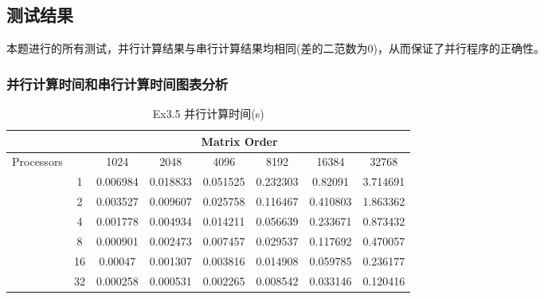 \documentclass[UTF8]{article}
\begin{document}
\subsection{测试结果}
本题进行的所有测试，并行计算结果与串行计算结果均相同(差的二范数为0)，从而保证了并行程序的正确性。
\subsubsection{并行计算时间和串行计算时间图表分析}


\begin{table}[h]
    \caption{Ex3.5 并行计算时间(s)}
    \label{tab:my-table}
    \centering
    \scalebox{0.8} {
    \begin{tabular}{|c|c|c|c|c|c|c|c|}
    \hline
                                & \multicolumn{7}{c|}{Matrix Order}                                    \\ \hline
    \multirow{7}{*}{Processors} &    & 1024     & 2048     & 4096     & 8192     & 16384    & 32768    \\ \cline{2-8} 
                                & 1  & 0.006984 & 0.018833 & 0.051525 & 0.232303 & 0.82091  & 3.714691 \\ \cline{2-8} 
                                & 2  & 0.003527 & 0.009607 & 0.025758 & 0.116467 & 0.410803 & 1.863362 \\ \cline{2-8} 
                                & 4  & 0.001778 & 0.004934 & 0.014211 & 0.056639 & 0.233671 & 0.873432 \\ \cline{2-8} 
                                & 8  & 0.000901 & 0.002473 & 0.007457 & 0.029537 & 0.117692 & 0.470057 \\ \cline{2-8} 
                                & 16 & 0.00047  & 0.001307 & 0.003816 & 0.014908 & 0.059785 & 0.236177 \\ \cline{2-8} 
                                & 32 & 0.000258 & 0.000531 & 0.002265 & 0.008542 & 0.033146 & 0.120416 \\ \hline
    \end{tabular}}
    \end{table}
\end{document}
